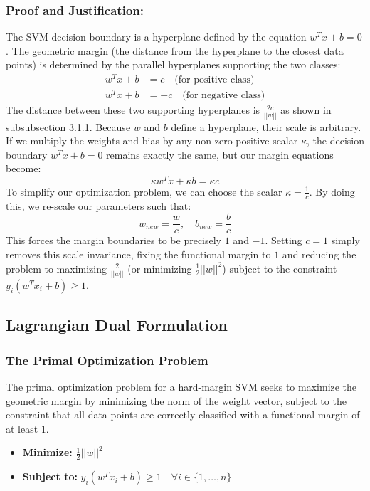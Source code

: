 \documentclass[twoside, 10pt]{article}
\begin{document}
\subsubsection{Proof and Justification:} 
The SVM decision boundary is a hyperplane defined by the equation $w^T x + b = 0$. The geometric margin (the distance from the hyperplane to the closest data points) is determined by the parallel hyperplanes supporting the two classes:
\begin{align*}
    w^T x + b &= c \quad \text{(for positive class)} \\
    w^T x + b &= -c \quad \text{(for negative class)}
\end{align*}
The distance between these two supporting hyperplanes is $\frac{2c}{||w||}$ as shown in subsubsection 3.1.1.
Because $w$ and $b$ define a hyperplane, their scale is arbitrary. If we multiply the weights and bias by any non-zero positive scalar $\kappa$, the decision boundary $w^T x + b = 0$ remains exactly the same, but our margin equations become:
\[ \kappa w^T x + \kappa b = \kappa c \]
To simplify our optimization problem, we can choose the scalar $\kappa = \frac{1}{c}$. By doing this, we re-scale our parameters such that:
\[ w_{new} = \frac{w}{c}, \quad b_{new} = \frac{b}{c} \]
This forces the margin boundaries to be precisely $1$ and $-1$. Setting $c=1$ simply removes this scale invariance, fixing the functional margin to $1$ and reducing the problem to maximizing $\frac{2}{||w||}$ (or minimizing $\frac{1}{2}||w||^2$) subject to the constraint $y_i(w^T x_i + b) \ge 1$.

\subsection{Lagrangian Dual Formulation}
\subsubsection{The Primal Optimization Problem}
The primal optimization problem for a hard-margin SVM seeks to maximize the geometric margin by minimizing the norm of the weight vector, subject to the constraint that all data points are correctly classified with a functional margin of at least 1.
\begin{itemize}
    \item \textbf{Minimize:} $\frac{1}{2}||w||^2$
    \item \textbf{Subject to:} $y_i(w^T x_i + b) \ge 1 \quad \forall i \in \{1, \dots, n\}$
\end{itemize}
\end{document}
